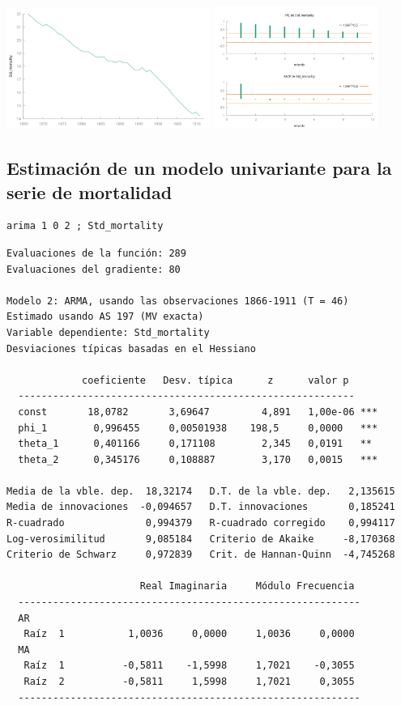 \documentclass[10pt]{article}
\begin{document}
\begin{center}
\includegraphics[width=0.5\textwidth]{./mortality-marriages/mortality.png} 
\includegraphics[width=0.4\textwidth]{./mortality-marriages/mortalityACF-PACF.png} 
\end{center}
\subsection*{Estimación de un modelo univariante para la serie de mortalidad}
\label{sec:orga279f63}

\begin{verbatim}
arima 1 0 2 ; Std_mortality
\end{verbatim}


\begin{verbatim}
Evaluaciones de la función: 289
Evaluaciones del gradiente: 80

Modelo 2: ARMA, usando las observaciones 1866-1911 (T = 46)
Estimado usando AS 197 (MV exacta)
Variable dependiente: Std_mortality
Desviaciones típicas basadas en el Hessiano

             coeficiente   Desv. típica      z      valor p 
  ----------------------------------------------------------
  const       18,0782       3,69647         4,891   1,00e-06 ***
  phi_1        0,996455     0,00501938    198,5     0,0000   ***
  theta_1      0,401166     0,171108        2,345   0,0191   **
  theta_2      0,345176     0,108887        3,170   0,0015   ***

Media de la vble. dep.  18,32174   D.T. de la vble. dep.   2,135615
Media de innovaciones  -0,094657   D.T. innovaciones       0,185241
R-cuadrado              0,994379   R-cuadrado corregido    0,994117
Log-verosimilitud       9,085184   Criterio de Akaike     -8,170368
Criterio de Schwarz     0,972839   Crit. de Hannan-Quinn  -4,745268

                       Real Imaginaria     Módulo Frecuencia
  -----------------------------------------------------------
  AR
   Raíz  1           1,0036     0,0000     1,0036     0,0000
  MA
   Raíz  1          -0,5811    -1,5998     1,7021    -0,3055
   Raíz  2          -0,5811     1,5998     1,7021     0,3055
  -----------------------------------------------------------
\end{verbatim}
\end{document}
